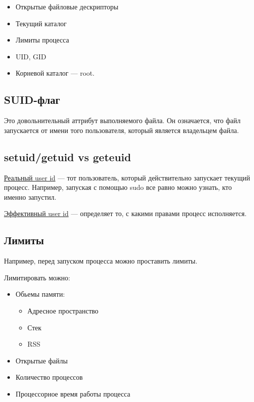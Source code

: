 \begin{itemize}
	\item Открытые файловые дескрипторы 
	\item Текущий каталог
	\item Лимиты процесса
	\item UID, GID
	\item Корневой каталог --- root.
\end{itemize}

\subsection{SUID-флаг}

Это довольнительный аттрибут выполняемого файла. Он означается, что файл запускается от
имени того пользователя, который является владельцем файла. 

\subsection{setuid/getuid vs geteuid}

\begin{Def}
	\underline{Реальный user id} --- тот пользователь, который действительно запускает текущий процесс. Например, запуская с помощью sudo все равно можно узнать, кто именно запустил.
\end{Def}

\begin{Def}
	\underline{Эффективный user id} --- определяет то, с какими правами процесс исполняется.
\end{Def}

\subsection{Лимиты}

Например, перед запуском процесса можно проставить лимиты. 

Лимитировать можно:

\begin{itemize}
	\item Обьемы памяти:
		\begin{itemize}
			\item Адресное пространство
			\item Стек
			\item RSS
		\end{itemize}
	\item Открытые файлы
	\item Количество процессов
	\item Процессорное время работы процесса
\end{itemize}
